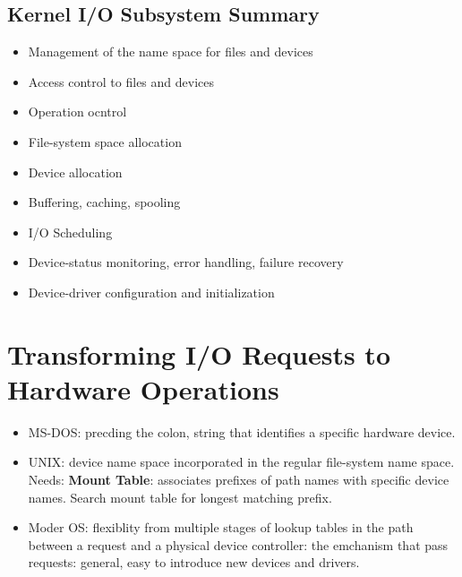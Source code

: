 \documentclass[10pt]{report}
\begin{document}
		\subsection{Kernel I/O Subsystem Summary}
		\begin{itemize}
			\item Management of the name space for files and devices
			\item Access control to files and devices
			\item Operation ocntrol
			\item File-system space allocation
			\item Device allocation
			\item Buffering, caching, spooling
			\item I/O Scheduling
			\item Device-status monitoring, error handling, failure recovery
			\item Device-driver configuration and initialization
		\end{itemize}

	\section{Transforming I/O Requests to Hardware Operations}
		\begin{itemize}
			\item MS-DOS: precding the colon, string that identifies a specific hardware device.
			\item UNIX: device name space incorporated in the regular file-system name space. Needs: \textbf{Mount Table}: associates prefixes of path names with specific device names. Search mount table for longest matching prefix.
			\item Moder OS: flexiblity from multiple stages of lookup tables in the path between a request and a physical device controller: the emchanism that pass requests: general, easy to introduce new devices and drivers.
		\end{itemize}
\end{document}
